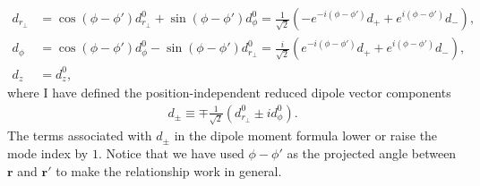 \documentclass[]{report}
\begin{document}
\begin{align}
d_{r\!_\perp}\! &= \cos(\phi\!-\!\phi')d^0_{r\!_\perp}\!\!+\!\sin(\phi\!-\!\phi')d^0_\phi=\frac{1}{\sqrt{2}}\left(-e^{-i(\phi\!-\!\phi')}d_++e^{i(\phi\!-\!\phi')}d_- \right),\\
d_\phi &=\cos(\phi\!-\!\phi')d^0_\phi\!-\!\sin(\phi\!-\!\phi')d^0_{r\!_\perp}=\frac{i}{\sqrt{2}}\left(e^{-i(\phi\!-\!\phi')}d_++e^{i(\phi\!-\!\phi')}d_- \right),\\
d_z &= d^0_z,
\end{align}
where I have defined the position-independent reduced dipole vector components
\begin{align}
d_\pm \equiv \mp \frac{1}{\sqrt{2}}(d^0_{r\!_\perp}\pm id^0_{\phi}).
\end{align}
The terms associated with $d_\pm$ in the dipole moment formula lower or raise the mode index by $1$. Notice that we have used $\phi\!-\!\phi'$ as the projected angle between $\mathbf{r}$ and $\mathbf{r}'$ to make the relationship work in general. 
\end{document}

